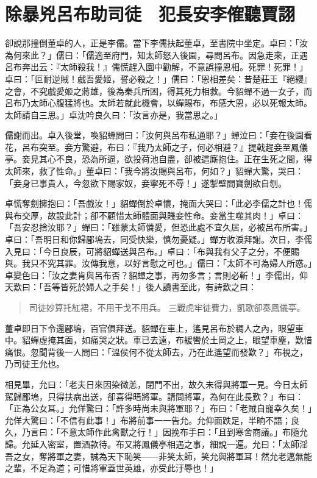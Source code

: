 
\chapter{除暴兇呂布助司徒　犯長安李傕聽賈詡}

卻說那撞倒董卓的人，正是李儒。當下李儒扶起董卓，至書院中坐定。卓曰：「汝為何來此？」儒曰：「儒適至府門，知太師怒入後園，尋問呂布。因急走來，正遇呂布奔出云：『太師殺我！』儒慌趕入園中勸解，不意誤撞恩相。死罪！死罪！」卓曰：「叵耐逆賊！戲吾愛姬，誓必殺之！」儒曰：「恩相差矣：昔楚莊王『絕纓』之會，不究戲愛姬之蔣雄，後為秦兵所困，得其死力相救。今貂蟬不過一女子，而呂布乃太師心腹猛將也。太師若就此機會，以蟬賜布，布感大恩，必以死報太師。太師請自三思。」卓沈吟良久曰：「汝言亦是，我當思之。」

儒謝而出。卓入後堂，喚貂蟬問曰：「汝何與呂布私通耶？」蟬泣曰：「妾在後園看花，呂布突至。妾方驚避，布曰：『我乃太師之子，何必相避？』提戟趕妾至鳳儀亭。妾見其心不良，恐為所逼，欲投荷池自盡，卻被這廝抱住。正在生死之間，得太師來，救了性命。」董卓曰：「我今將汝賜與呂布，何如？」貂蟬大驚，哭曰：「妾身已事貴人，今忽欲下賜家奴，妾寧死不辱！」遂掣壁間寶劍欲自刎。

卓慌奪劍擁抱曰：「吾戲汝！」貂蟬倒於卓懷，掩面大哭曰：「此必李儒之計也！儒與布交厚，故設此計；卻不顧惜太師體面與賤妾性命。妾當生噬其肉！」卓曰：「吾安忍捨汝耶？」蟬曰：「雖蒙太師憐愛，但恐此處不宜久居，必被呂布所害。」卓曰：「吾明日和你歸郿塢去，同受快樂，慎勿憂疑。」蟬方收淚拜謝。次日，李儒入見曰：「今日良辰，可將貂蟬送與呂布。」卓曰：「布與我有父子之分，不便賜與。我只不究其罪。汝傳我意，以好言慰之可也。」儒曰：「太師不可為婦人所惑。」卓變色曰：「汝之妻肯與呂布否？貂蟬之事，再勿多言；言則必斬！」李儒出，仰天歎曰：「吾等皆死於婦人之手矣！」後人讀書至此，有詩歎之曰：

\begin{quote}
司徒妙算托紅裙，不用干戈不用兵。
三戰虎牢徒費力，凱歌卻奏鳳儀亭。
\end{quote}

董卓即日下令還郿塢，百官俱拜送。貂蟬在車上，遙見呂布於稠人之內，眼望車中。貂蟬虛掩其面，如痛哭之狀。車已去遠，布緩轡於土岡之上，眼望車塵，歎惜痛恨。忽聞背後一人問曰：「溫侯何不從太師去，乃在此遙望而發歎？」布視之，乃司徒王允也。

相見畢，允曰：「老夫日來因染微恙，閉門不出，故久未得與將軍一見。今日太師駕歸郿塢，只得扶病出送，卻喜得晤將軍。請問將軍，為何在此長歎？」布曰：「正為公女耳。」允佯驚曰：「許多時尚未與將軍耶？」布曰：「老賊自寵幸久矣！」允佯大驚曰：「不信有此事！」布將前事一一告允。允仰面跌足，半晌不語；良久，乃言曰：「不意太師作此禽獸之行！」因挽布手曰：「且到寒舍商議。」布隨允歸。允延入密室，置酒款待。布又將鳳儀亭相遇之事，細說一遍。允曰：「太師淫吾之女，奪將軍之妻，誠為天下恥笑——非笑太師，笑允與將軍耳！然允老邁無能之輩，不足為道；可惜將軍蓋世英雄，亦受此汙辱也！」


